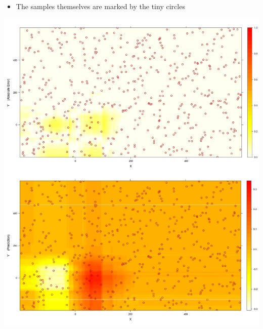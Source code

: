 \begin{itemize}
	\item The samples themselves are marked by the tiny circles
\end{itemize}

\begin{center}
  \includegraphics[width=\textwidth]{figures/ASK-first-plot.png}
\end{center}




